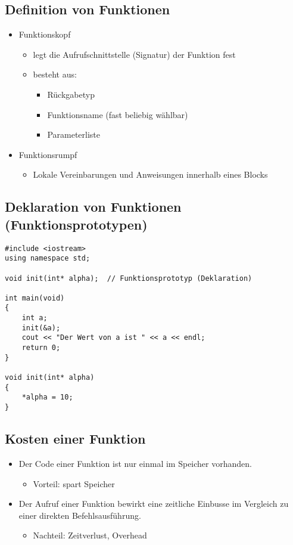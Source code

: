 \subsection{Definition von Funktionen}
\begin{itemize}
	\item Funktionskopf
	\begin{itemize}
		\item legt die Aufrufschnittstelle (Signatur) der Funktion fest
		\item besteht aus:
		\begin{itemize}
			\item Rückgabetyp
			\item Funktionsname (fast beliebig wählbar)
			\item Parameterliste
		\end{itemize}
	\end{itemize}
	\item Funktionsrumpf
	\begin{itemize}
		\item Lokale Vereinbarungen und Anweisungen innerhalb eines Blocks
	\end{itemize}
\end{itemize}

\subsection{Deklaration von Funktionen (Funktionsprototypen)}
\begin{minipage}{0.75\linewidth}
\begin{lstlisting}
#include <iostream>
using namespace std;

void init(int* alpha);	// Funktionsprototyp (Deklaration)

int main(void)
{
	int a;
	init(&a);
	cout << "Der Wert von a ist " << a << endl;
	return 0;
}

void init(int* alpha)
{
	*alpha = 10;
}
\end{lstlisting}
\end{minipage}

\subsection{Kosten einer Funktion}
\begin{itemize}
	\item Der Code einer Funktion ist nur einmal im Speicher vorhanden.
	\begin{itemize}
		\item Vorteil: spart Speicher
	\end{itemize}
	\item Der Aufruf einer Funktion bewirkt eine zeitliche Einbusse im Vergleich zu einer direkten Befehlsausführung.
	\begin{itemize}
		\item Nachteil: Zeitverlust, Overhead
	\end{itemize}
\end{itemize}

